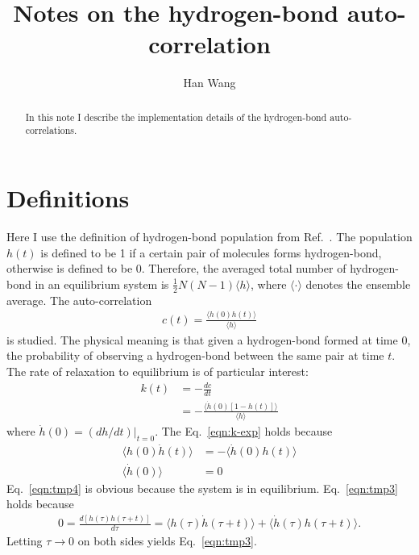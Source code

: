 \documentclass[unsortedaddress,a4paper,onecolumn]{revtex4}
\begin{document}
\title{Notes on the hydrogen-bond auto-correlation}
\author{Han Wang}
   
\begin{abstract}
  In this note I describe the implementation details of the hydrogen-bond auto-correlations.
\end{abstract}

\maketitle

\section{Definitions}
Here I use the definition of hydrogen-bond population from
Ref.~\cite{luzar1996effect, luzar1996hydrogen}.  The population $h(t)$
is defined to be 1 if a certain pair of molecules forms hydrogen-bond,
otherwise is defined to be 0. Therefore, the averaged total number of
hydrogen-bond in an equilibrium system is $\frac12 N(N-1)\langle
h\rangle$, where $\langle\cdot\rangle$ denotes the ensemble average.
The auto-correlation
\begin{align}
  c(t) = \frac{\langle h(0) h(t)\rangle}{\langle h\rangle}
\end{align}
is studied. The physical meaning is that given a hydrogen-bond formed
at time $0$, the probability of observing a hydrogen-bond between the
same pair at time $t$.
The rate of relaxation to equilibrium is of particular interest:
\begin{align}\label{eqn:k-def}
  k(t) &= -\frac{dc}{dt}\\\label{eqn:k-exp}
  &= -\frac{\langle \dot h(0) [1 - h(t)] \rangle}{\langle h\rangle}
\end{align}
where $\dot h(0) = (dh/dt)\vert_{t=0}$. The Eq.~\eqref{eqn:k-exp} holds because
\begin{align} \label{eqn:tmp3}
  \langle h(0) \dot h(t) \rangle &= - \langle \dot h(0) h(t)\rangle \\\label{eqn:tmp4}
  \langle \dot h(0) \rangle &= 0
\end{align}
Eq.~\eqref{eqn:tmp4} is obvious because the system is in equilibrium. Eq.~\eqref{eqn:tmp3} holds because
\begin{align}
  0 = \frac{d [ h(\tau) h(\tau+t) ] }{d\tau} =  \langle h(\tau) \dot h(\tau+t)\rangle  + \langle \dot h(\tau) h(\tau+t)\rangle.
\end{align}
Letting $\tau \rightarrow 0$ on both sides yields Eq.~\eqref{eqn:tmp3}.
\end{document}
